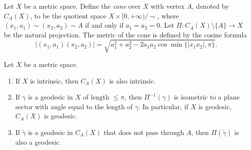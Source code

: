 \begin{defn}
    Let $X$ be a metric space.
    Define the \emph{cone} over $X$ with vertex $A$, denoted by $C_A(X)$, to be the quotient space $X\times[0,+\infty)/\sim$, where $(x_1,a_1)\sim(x_2,a_2)\sim A$ if and only if $a_1=a_2=0$.
    Let $\Pi:C_A(X)\setminus\{A\}\to X$ be the natural projection.
    The metric of the cone is defined by the cosine formula
    \[|(x_1,a_1)(x_2,a_2)|=\sqrt{a_1^2+a_2^2-2a_1a_2\cos\min\{|x_1x_2|,\pi\}}.\]
\end{defn}

\begin{lem}\label{lem:cone intrinsic}
    Let $X$ be a metric space.
    \begin{enumerate}[\rm (a)]
        \item If $X$ is intrinsic, then $C_A(X)$ is also intrinsic.
        \item If $\gamma$ is a geodesic in $X$ of length $\leq\pi$, then $\Pi^{-1}(\gamma)$ is isometric to a plane sector with angle equal to the length of $\gamma$.
        In particular, if $X$ is geodesic, $C_A(X)$ is geodesic.
        \item If $\tilde\gamma$ is a geodesic in $C_A(X)$ that does not pass through $A$, then $\Pi(\tilde\gamma)$ is also a geodesic.
    \end{enumerate}
\end{lem}

